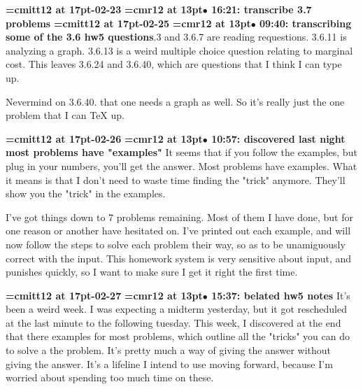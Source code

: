 {\medskip\noindent\bf\font\titlefont=cmitt12 at 17pt-02-23}\medskip
{\smallskip\noindent\bf\font\titlefont=cmr12 at 13pt\titlefont $\bullet$ 16:21: transcribe 3.7 problems}\smallskip
{\medskip\noindent\bf\font\titlefont=cmitt12 at 17pt-02-25}\medskip
{\smallskip\noindent\bf\font\titlefont=cmr12 at 13pt\titlefont $\bullet$ 09:40: transcribing some of the 3.6 hw5 questions}.3 and 3.6.7 are reading requestions. 3.6.11 is analyzing a graph. 3.6.13 is a weird multiple choice question relating to marginal cost. This leaves 3.6.24 and 3.6.40, which are questions that I think I can type up.
\par

Nevermind on 3.6.40. that one needs a graph as well. So it's really just the one problem that I can TeX up.
\par

{\medskip\noindent\bf\font\titlefont=cmitt12 at 17pt-02-26}\medskip
{\smallskip\noindent\bf\font\titlefont=cmr12 at 13pt\titlefont $\bullet$ 10:57: discovered last night most problems have "examples"}\smallskip
It seems that if you follow the examples, but plug in your numbers, you'll get the answer. Most problems have examples. What it means is that I don't need to waste time finding the "trick" anymore. They'll show you the "trick" in the examples.
\par

I've got things down to 7 problems remaining. Most of them I have done, but for one reason or another have hesitated on. I've printed out each example, and will now follow the steps to solve each problem their way, so as to be unamiguously correct with the input. This homework system is very sensitive about input, and punishes quickly, so I want to make sure I get it right the first time.
\par

{\medskip\noindent\bf\font\titlefont=cmitt12 at 17pt-02-27}\medskip
{\smallskip\noindent\bf\font\titlefont=cmr12 at 13pt\titlefont $\bullet$ 15:37: belated hw5 notes}\smallskip
It's been a weird week. I was expecting a midterm yesterday, but it got rescheduled at the last minute to the following tuesday. This week, I discovered at the end that there examples for most problems, which outline all the "tricks" you can do to solve a the problem. It's pretty much a way of giving the answer without giving the answer. It's a lifeline I intend to use moving forward, because I'm worried about spending too much time on these.
\par

